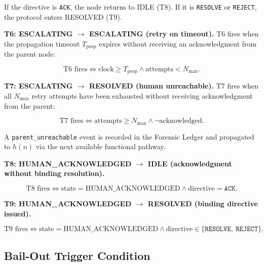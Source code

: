 If the directive is \texttt{ACK}, the node returns to IDLE (T8). If it is \texttt{RESOLVE} or \texttt{REJECT}, the protocol enters RESOLVED (T9).

\bigskip
\noindent\textbf{T6: ESCALATING $\rightarrow$ ESCALATING (retry on timeout).} T6 fires when the propagation timeout $T_{\text{prop}}$ expires without receiving an acknowledgment from the parent node:

\begin{equation}
\text{T6 fires} \iff \text{clock} \geq T_{\text{prop}} \land \text{attempts} < N_{\max}. \tag{T6}
\end{equation}

\bigskip
\noindent\textbf{T7: ESCALATING $\rightarrow$ RESOLVED (human unreachable).} T7 fires when all $N_{\max}$ retry attempts have been exhausted without receiving acknowledgment from the parent:

\begin{equation}
\text{T7 fires} \iff \text{attempts} \geq N_{\max} \land \neg\text{acknowledged}. \tag{T7}
\end{equation}

A \texttt{parent\_unreachable} event is recorded in the Forensic Ledger and propagated to $h(n)$ via the next available functional pathway.

\bigskip
\noindent\textbf{T8: HUMAN\_ACKNOWLEDGED $\rightarrow$ IDLE (acknowledgment without binding resolution).}

\begin{equation}
\text{T8 fires} \iff \text{state} = \text{HUMAN\_ACKNOWLEDGED} \land \text{directive} = \texttt{ACK}. \tag{T8}
\end{equation}

\bigskip
\noindent\textbf{T9: HUMAN\_ACKNOWLEDGED $\rightarrow$ RESOLVED (binding directive issued).}

\begin{equation}
\text{T9 fires} \iff \text{state} = \text{HUMAN\_ACKNOWLEDGED} \land \text{directive} \in \{\texttt{RESOLVE},\ \texttt{REJECT}\}. \tag{T9}
\end{equation}

\subsection{Bail-Out Trigger Condition}\label{sec:bailout-trigger}


